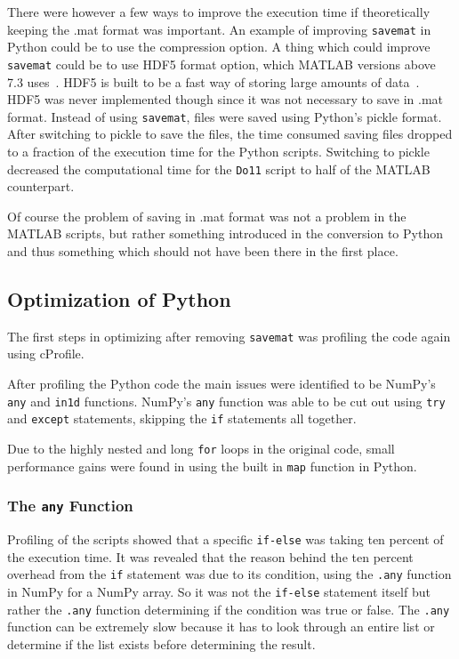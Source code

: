 \documentclass[12pt, a4paper]{article}
\begin{document}
There were however a few ways to improve the execution time if theoretically keeping the .mat format was important.
An example of improving \texttt{savemat} in Python could be to use the compression option.
A thing which could improve \texttt{savemat} could be to use HDF5 format option, which MATLAB versions above 7.3 uses~\cite{Mat73HDF5}.
HDF5 is built to be a fast way of storing large amounts of data~\cite{WhatIsHDF5}.
HDF5 was never implemented though since it was not necessary to save in .mat format.
Instead of using \texttt{savemat}, files were saved using Python's pickle format.
After switching to pickle to save the files, the time consumed saving files dropped to a fraction of the execution time for the Python scripts.
Switching to pickle decreased the computational time for the \texttt{Do11} script to half of the MATLAB counterpart. %

Of course the problem of saving in .mat format was not a problem in the MATLAB scripts, but rather something introduced in the conversion to Python and thus something which should not have been there in the first place.

\subsection{Optimization of Python}
The first steps in optimizing after removing \texttt{savemat} was profiling the code again using cProfile.

After profiling the Python code the main issues were identified to be NumPy's \texttt{any} and \texttt{in1d} functions.
NumPy's \texttt{any} function was able to be cut out using \texttt{try} and \texttt{except} statements, skipping the \texttt{if} statements all together.%

Due to the highly nested and long \texttt{for} loops in the original code, small performance gains were found in using the built in \texttt{map} function in Python.

\subsubsection{The \texttt{any} Function}\label{metodAny}

Profiling of the scripts showed that a specific \texttt{if-else} was taking ten percent of the execution time.
It was revealed that the reason behind the ten percent overhead from the \texttt{if} statement was due to its condition, using the \texttt{.any} function in NumPy for a NumPy array.
So it was not the \texttt{if-else} statement itself but rather the \texttt{.any} function determining if the condition was true or false.
The \texttt{.any} function can be extremely slow because it has to look through an entire list or determine if the list exists before determining the result.
\end{document}
